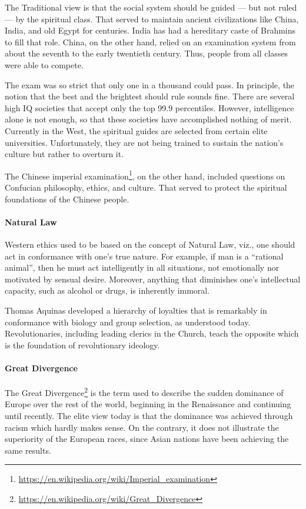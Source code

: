 The Traditional view is that the social system should be guided --- but not ruled --- by the spiritual class. That served to maintain ancient civilizations like China, India, and old Egypt for centuries. India has had a hereditary caste of Brahmins to fill that role. China, on the other hand, relied on an examination system from about the seventh to the early twentieth century. Thus, people from all classes were able to compete.

The exam was so strict that only one in a thousand could pass. In principle, the notion that the best and the brightest should rule sounds fine. There are several high IQ societies that accept only the top 99.9 percentiles. However, intelligence alone is not enough, so that these societies have accomplished nothing of merit. Currently in the West, the spiritual guides are selected from certain elite universities. Unfortunately, they are not being trained to sustain the nation's culture but rather to overturn it.

The Chinese imperial examination\footnote{\url{https://en.wikipedia.org/wiki/Imperial\_examination}}, on the other hand, included questions on Confucian philosophy, ethics, and culture. That served to protect the spiritual foundations of the Chinese people.

\paragraph{Natural Law}


Western ethics used to be based on the concept of Natural Law, viz., one should act in conformance with one's true nature. For example, if man is a ``rational animal'', then he must act intelligently in all situations, not emotionally nor motivated by sensual desire. Moreover, anything that diminishes one's intellectual capacity, such as alcohol or drugs, is inherently immoral.

Thomas Aquinas developed a hierarchy of loyalties that is remarkably in conformance with biology and group selection, as understood today. Revolutionaries, including leading clerics in the Church, teach the opposite which is the foundation of revolutionary ideology.

\paragraph{Great Divergence}


The Great Divergence\footnote{\url{https://en.wikipedia.org/wiki/Great\_Divergence}} is the term used to describe the sudden dominance of Europe over the rest of the world, beginning in the Renaissance and continuing until recently. The elite view today is that the dominance was achieved through racism which hardly makes sense. On the contrary, it does not illustrate the superiority of the European races, since Asian nations have been achieving the same results.

